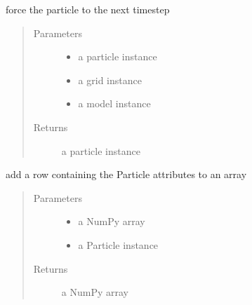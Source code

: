 \documentclass[letterpaper,10pt,english]{sphinxmanual}
\begin{document}
\begin{fulllineitems}
\label{\detokenize{octapy:octapy.tracking.force_particle}}
\sphinxAtStartPar
force the particle to the next timestep
\begin{quote}\begin{description}
\item[{Parameters}] \leavevmode\begin{itemize}
\item {} 
\sphinxAtStartPar
{} \textendash{} a particle instance

\item {} 
\sphinxAtStartPar
{} \textendash{} a grid instance

\item {} 
\sphinxAtStartPar
{} \textendash{} a model instance

\end{itemize}

\item[{Returns}] \leavevmode
\sphinxAtStartPar
a particle instance

\end{description}\end{quote}

\end{fulllineitems}


\begin{fulllineitems}
\label{\detokenize{octapy:octapy.tracking.add_row_to_arr}}
\sphinxAtStartPar
add a row containing the Particle attributes to an array
\begin{quote}\begin{description}
\item[{Parameters}] \leavevmode\begin{itemize}
\item {} 
\sphinxAtStartPar
{} \textendash{} a NumPy array

\item {} 
\sphinxAtStartPar
{} \textendash{} a Particle instance

\end{itemize}

\item[{Returns}] \leavevmode
\sphinxAtStartPar
a NumPy array

\end{description}\end{quote}

\end{fulllineitems}
\end{document}
